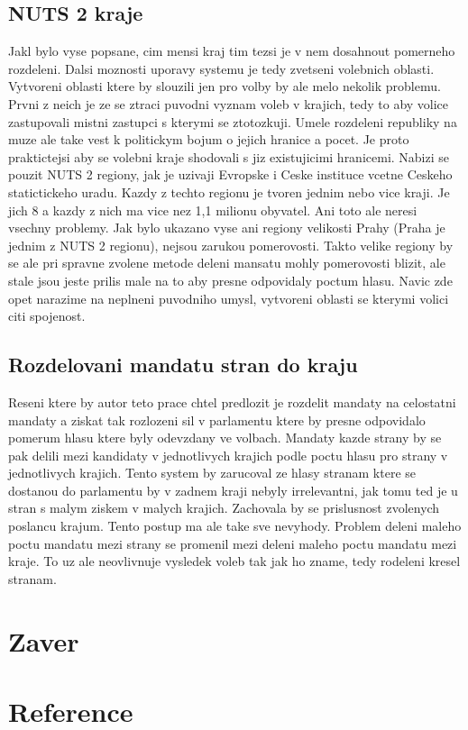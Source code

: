 \documentclass[12pt,a4paper]{article}
\begin{document}
\subsection{NUTS 2 kraje}
Jakl bylo vyse popsane, cim mensi kraj tim tezsi je v nem dosahnout pomerneho rozdeleni.
Dalsi moznosti uporavy systemu je tedy zvetseni volebnich oblasti.
Vytvoreni oblasti ktere by slouzili jen pro volby by ale melo nekolik problemu.
Prvni z neich je ze se ztraci puvodni vyznam voleb v krajich, tedy to aby volice zastupovali  mistni zastupci s kterymi se ztotozkuji.
Umele rozdeleni republiky na  muze ale take vest k politickym bojum o jejich hranice a pocet. %
Je proto praktictejsi aby se volebni kraje shodovali s jiz existujicimi hranicemi.
Nabizi se pouzit NUTS 2 regiony, jak je uzivaji Evropske i Ceske instituce vcetne Ceskeho statictickeho uradu.
Kazdy z techto regionu je tvoren jednim nebo vice kraji.
Je jich 8 a kazdy z nich ma vice nez 1,1 milionu obyvatel.
Ani toto ale neresi vsechny problemy.
Jak bylo ukazano vyse ani regiony velikosti Prahy (Praha je jednim z NUTS 2 regionu), nejsou zarukou pomerovosti.
Takto velike regiony by se ale pri spravne zvolene metode deleni mansatu mohly pomerovosti blizit, ale stale jsou jeste prilis male na to aby presne odpovidaly poctum hlasu.
Navic zde opet narazime na neplneni puvodniho umysl, vytvoreni oblasti se kterymi volici citi spojenost.
\subsection{Rozdelovani mandatu stran do kraju}
Reseni ktere by autor teto prace chtel predlozit je rozdelit mandaty na celostatni mandaty a ziskat tak rozlozeni sil v parlamentu ktere by presne odpovidalo pomerum hlasu ktere byly odevzdany ve volbach.
Mandaty kazde strany by se pak delili mezi kandidaty v jednotlivych krajich podle poctu hlasu pro strany v jednotlivych krajich.
Tento system by zarucoval ze hlasy stranam ktere se dostanou do parlamentu by v zadnem kraji nebyly irrelevantni, jak tomu ted je u stran s malym ziskem v malych krajich. 
Zachovala by se prislusnost zvolenych poslancu krajum.
Tento postup ma ale take sve nevyhody.
Problem deleni maleho poctu mandatu mezi strany se promenil mezi deleni maleho poctu mandatu mezi kraje.
To uz ale neovlivnuje vysledek voleb tak jak ho zname, tedy rodeleni kresel stranam.


\section{Zaver}

\section{Reference}
\printbibliography[heading=none]
\end{document}
